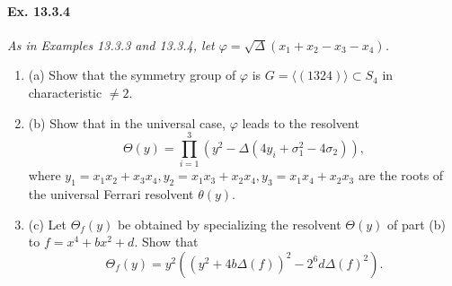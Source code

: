 \documentclass[11pt,a4paper]{article}
\newcommand{\be} {\begin{enumerate}}
\newcommand{\ee} {\end{enumerate}}
\begin{document}
\paragraph{Ex. 13.3.4}

{\it As in Examples 13.3.3 and 13.3.4, let $\varphi=\sqrt{\Delta}(x_1+x_2-x_3-x_4)$.
\be
\item[(a)] Show that the symmetry group of $\varphi$ is $G=\langle(1324)\rangle\subset S_4$ in characteristic $\ne 2$.
\item[(b)] Show that in the universal case, $\varphi$ leads to the resolvent $$\Theta(y)=\prod_{i=1}^3 ( y^2 - \Delta(4y_i+\sigma_1^2-4\sigma_2)) ,$$ where $y_1=x_1x_2+x_3x_4,y_2=x_1x_3+x_2x_4,y_3=x_1x_4+x_2x_3$ are the roots of the universal Ferrari resolvent $\theta(y)$.
\item[(c)] Let $\Theta_f (y)$ be obtained by specializing the resolvent $\Theta (y)$ of part (b) to $f=x^4+bx^2+d$. Show that $$\Theta_f (y)=y^2((y^2+4b\Delta(f))^2-2^6 d\Delta(f)^2). $$
\ee
}
\end{document}
